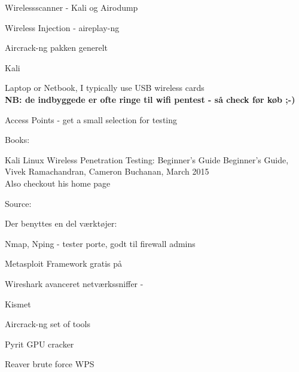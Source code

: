 \documentclass[Screen16to9,17pt]{foils}
\begin{document}
\begin{list2}
\item Wirelessscanner - Kali og Airodump
\item Wireless Injection - aireplay-ng
\item Aircrack-ng pakken generelt
\item Kali 
\end{list2}





\begin{list1}
\item Laptop or Netbook, I typically use USB wireless cards\\
{\bf NB: de indbyggede er ofte ringe til wifi pentest - så check før køb ;-)}
\item Access Points - get a small selection for testing
\item Books:
\begin{list2}
\item
Kali Linux Wireless Penetration Testing: Beginner's Guide
Beginner's Guide, Vivek Ramachandran, Cameron Buchanan, March 2015\\
Also checkout his home page 
\end{list2}
\end{list1}



Source: 



\begin{list1}
\item Der benyttes en del værktøjer:
\begin{list2}
\item Nmap, Nping - tester porte, godt til firewall admins 
\item Metasploit Framework gratis på 
\item Wireshark avanceret netværkssniffer - 
\item Kismet 
\item Aircrack-ng set of tools 
\item Pyrit GPU cracker 
\item Reaver brute force WPS 
\end{list2}
\end{list1}
\end{document}
